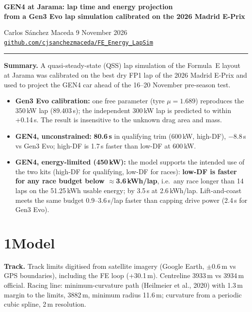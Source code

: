 \documentclass[10pt,a4paper]{article}
\begin{document}
{\Large\bfseries GEN4 at Jarama: lap time and energy projection\\[2pt]
from a Gen3 Evo lap simulation calibrated on the 2026 Madrid E-Prix}

\smallskip
Carlos S\'anchez Maceda \hfill 9 November 2026 \hfill
\href{https://github.com/cjsanchezmaceda/FE_Energy_LapSim}{\texttt{github.com/cjsanchezmaceda/FE\_Energy\_LapSim}}

\noindent\rule{\linewidth}{0.4pt}

\textbf{Summary.}
A quasi-steady-state (QSS) lap simulation of the Formula~E layout at Jarama was calibrated on the
best dry FP1 lap of the 2026 Madrid E-Prix and used to project the GEN4 car ahead of the
16--20 November pre-season test.
\begin{itemize}
  \item \textbf{Gen3 Evo calibration:} one free parameter (tyre $\mu = 1.689$) reproduces the
        350\,kW lap (89.403\,s); the independent 300\,kW lap is predicted to within
        +0.14\,s. The result is insensitive to the unknown drag area and mass.
  \item \textbf{GEN4, unconstrained:} \textbf{80.6\,s} in qualifying trim (600\,kW, high-DF),
        $-8.8$\,s vs Gen3 Evo; high-DF is 1.7\,s faster than low-DF at 600\,kW.
  \item \textbf{GEN4, energy-limited (450\,kW):} the model supports the intended use of the two kits
        (high-DF for qualifying, low-DF for races): \textbf{low-DF is faster for any race budget below
        $\approx$3.6\,kWh/lap}, i.e.\ any race longer than 14 laps on the 51.25\,kWh usable energy;
        by 3.5\,s at 2.6\,kWh/lap. Lift-and-coast meets the same budget
        0.9--3.6\,s/lap faster than capping drive power (2.4\,s for Gen3 Evo).
\end{itemize}

\section*{1\quad Model}

\textbf{Track.} Track limits digitised from satellite imagery (Google Earth, $\pm0.6$\,m vs GPS
boundaries), including the FE loop (+30.1\,m). Centreline 3933\,m vs 3934\,m official.
Racing line: minimum-curvature path (Heilmeier et al., 2020) with 1.3\,m margin to the limits,
3882\,m, minimum radius 11.6\,m; curvature from a periodic cubic spline, 2\,m resolution.
\end{document}
